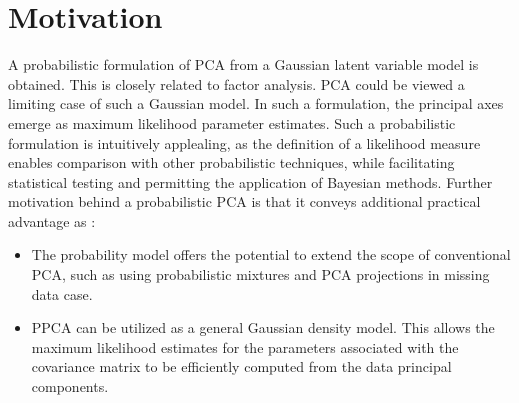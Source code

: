 \section{Motivation}
A probabilistic formulation of PCA from a Gaussian latent variable model is obtained. This is closely related to factor analysis. PCA could be viewed a limiting case of such a Gaussian model. In such a formulation, the principal axes emerge as maximum likelihood parameter estimates. Such a probabilistic formulation is intuitively applealing, as the definition of a likelihood measure enables comparison with other probabilistic techniques, while facilitating statistical testing and permitting the application of Bayesian methods. Further motivation behind a probabilistic PCA is that it conveys additional practical advantage as :
\begin{itemize}
\item The probability model offers the potential to extend the scope of conventional PCA, such as using probabilistic mixtures and PCA projections in missing data case.
\item PPCA can be utilized as a general Gaussian density model. This allows the maximum likelihood estimates for the parameters associated with the covariance matrix to be efficiently computed from the data principal components.
\end{itemize}

